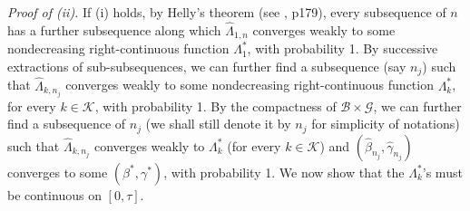 \documentclass{statsoc}
\begin{document}
\textit{Proof of (ii).} If (i) holds, by Helly's theorem (see \cite{loeve}, p179), every subsequence of $n$ has a further subsequence along which $\widehat\Lambda_{1,n}$ converges weakly to some nondecreasing right-continuous function $\Lambda_1^\ast$, with probability 1. By successive extractions of sub-subsequences, we can further find a subsequence (say $n_j$) such that $\widehat\Lambda_{k,n_j}$ converges weakly to some nondecreasing right-continuous function $\Lambda_k^\ast$, for every $k\in\mathcal K$, with probability 1. By the compactness of $\mathcal B\times\mathcal G$, we can further find a subsequence of $n_j$ (we shall still denote it by $n_j$ for simplicity of notations) such that $\widehat\Lambda_{k,n_j}$ converges weakly to $\Lambda_k^\ast$ (for every $k\in\mathcal K$) and $(\widehat\beta_{n_j}, \widehat\gamma_{n_j})$ converges to some $(\beta^\ast,\gamma^\ast)$, with probability 1. We now show that the $\Lambda_k^\ast$'s must be continuous on $[0,\tau]$.
\end{document}
